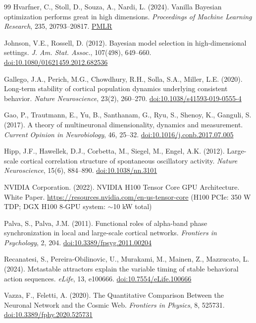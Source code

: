 \documentclass[12pt]{article}
\begin{document}
\begin{thebibliography}{99}
Hvarfner, C., Stoll, D., Souza, A., Nardi, L. (2024). Vanilla Bayesian optimization performs great in high dimensions. \textit{Proceedings of Machine Learning Research}, 235, 20793--20817. \href{https://proceedings.mlr.press/v235/hvarfner24a.html}{PMLR}

Johnson, V.E., Rossell, D. (2012). Bayesian model selection in high-dimensional settings. \textit{J. Am. Stat. Assoc.}, 107(498), 649--660. \href{https://doi.org/10.1080/01621459.2012.682536}{doi:10.1080/01621459.2012.682536}

Gallego, J.A., Perich, M.G., Chowdhury, R.H., Solla, S.A., Miller, L.E. (2020). Long-term stability of cortical population dynamics underlying consistent behavior. \textit{Nature Neuroscience}, 23(2), 260--270. \href{https://doi.org/10.1038/s41593-019-0555-4}{doi:10.1038/s41593-019-0555-4}

Gao, P., Trautmann, E., Yu, B., Santhanam, G., Ryu, S., Shenoy, K., Ganguli, S. (2017). A theory of multineuronal dimensionality, dynamics and measurement. \textit{Current Opinion in Neurobiology}, 46, 25--32. \href{https://doi.org/10.1016/j.conb.2017.07.005}{doi:10.1016/j.conb.2017.07.005}

Hipp, J.F., Hawellek, D.J., Corbetta, M., Siegel, M., Engel, A.K. (2012). Large-scale cortical correlation structure of spontaneous oscillatory activity. \textit{Nature Neuroscience}, 15(6), 884--890. \href{https://doi.org/10.1038/nn.3101}{doi:10.1038/nn.3101}

NVIDIA Corporation. (2022). NVIDIA H100 Tensor Core GPU Architecture. White Paper. \href{https://resources.nvidia.com/en-us-tensor-core}{https://resources.nvidia.com/en-us-tensor-core} (H100 PCIe: 350 W TDP; DGX H100 8-GPU system: $\sim$10 kW total)

Palva, S., Palva, J.M. (2011). Functional roles of alpha-band phase synchronization in local and large-scale cortical networks. \textit{Frontiers in Psychology}, 2, 204. \href{https://doi.org/10.3389/fpsyg.2011.00204}{doi:10.3389/fpsyg.2011.00204}

Recanatesi, S., Pereira-Obilinovic, U., Murakami, M., Mainen, Z., Mazzucato, L. (2024). Metastable attractors explain the variable timing of stable behavioral action sequences. \textit{eLife}, 13, e100666. \href{https://doi.org/10.7554/eLife.100666}{doi:10.7554/eLife.100666}

Vazza, F., Feletti, A. (2020). The Quantitative Comparison Between the Neuronal Network and the Cosmic Web. \textit{Frontiers in Physics}, 8, 525731. \href{https://doi.org/10.3389/fphy.2020.525731}{doi:10.3389/fphy.2020.525731}


\end{thebibliography}
\end{document}
